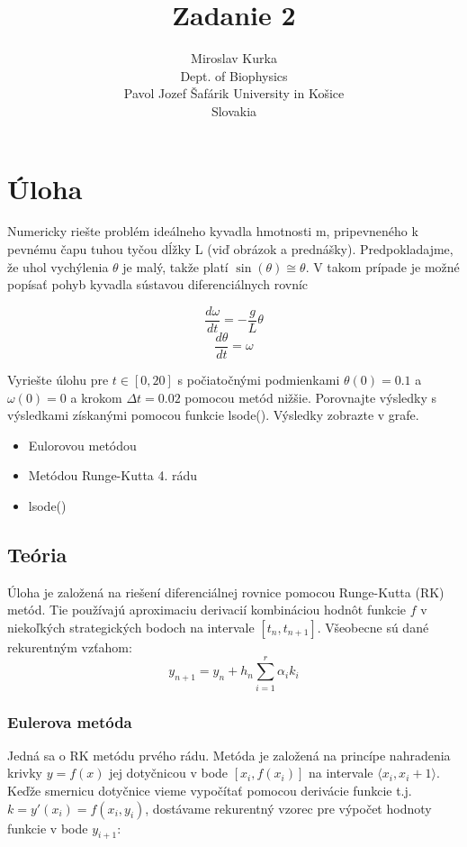 \documentclass{article}
\title{Zadanie 2}
\author{Miroslav Kurka\\
  \small Dept. of Biophysics\\
  \small Pavol Jozef Šafárik University in Košice\\
  \small Slovakia 
}
\theoremstyle{definition}
\theoremstyle{remark}
\begin{document}
\maketitle


\section{Úloha}
Numericky riešte problém ideálneho kyvadla hmotnosti m, pripevneného k pevnému čapu tuhou tyčou dĺžky L (viď obrázok a prednášky). Predpokladajme, že uhol vychýlenia $\theta$ je malý, takže platí $\sin(\theta) \cong \theta$. V takom prípade je možné popísať pohyb kyvadla sústavou diferenciálnych rovníc


$$\frac{d\omega}{dt}=-\frac{g}{L}\theta$$
$$\frac{d\theta}{dt}=\omega$$

Vyriešte úlohu pre $t\in[0,20]$ s počiatočnými podmienkami $\theta(0)=0.1$ a $\omega(0)=0$ a krokom $\Delta t= 0.02$ pomocou metód nižšie. Porovnajte výsledky s výsledkami získanými pomocou funkcie lsode(). Výsledky zobrazte v grafe. 
\begin{itemize}
    \item Eulorovou metódou
    \item Metódou Runge-Kutta 4. rádu
    \item lsode()
\end{itemize}

\subsection{Teória}\label{sec:nothing}
Úloha je založená na riešení diferenciálnej rovnice pomocou Runge-Kutta (RK) metód. Tie používajú aproximaciu derivacií kombináciou hodnôt funkcie $f$ v niekoľkých strategických bodoch na intervale $[t_n, t_{n+1}]$\cite{Zukovic}. Všeobecne sú dané rekurentným vzťahom:
\begin{equation}
    y_{n+1}=y_n+h_n\sum_{i=1}^r \alpha_i k_i
\end{equation}
\subsubsection{Eulerova metóda}
Jedná sa o RK metódu prvého rádu. Metóda je založená na princípe nahradenia krivky $y=f(x)$ jej dotyčnicou v bode $[x_i,f(x_i)]$ na intervale $⟨x_i,x_i+1⟩$. Keďže smernicu dotyčnice vieme vypočítať pomocou derivácie funkcie t.j. $k=y'(x_i)=f(x_i,y_i)$, dostávame rekurentný vzorec pre výpočet hodnoty funkcie v bode $y_{i+1}$\cite{Web}:
\end{document}
